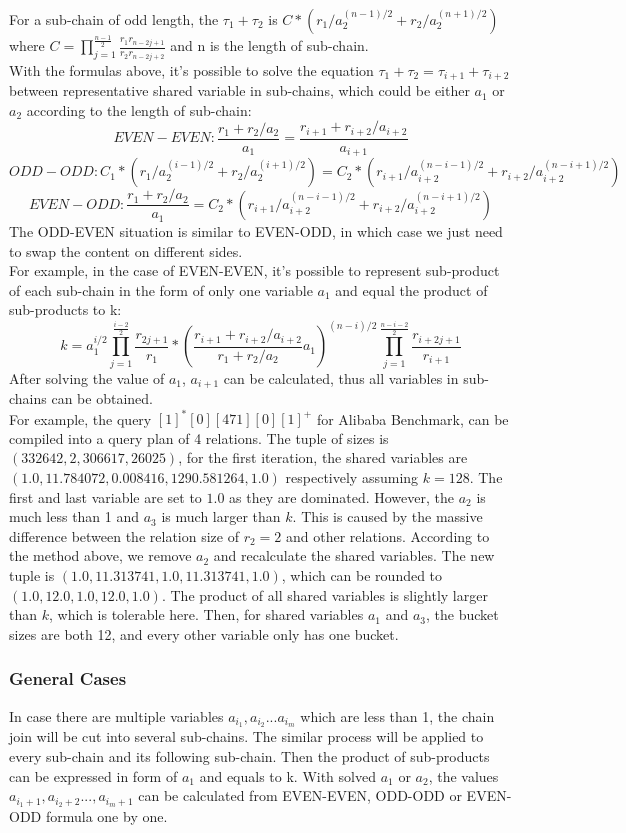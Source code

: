 For a sub-chain of odd length, the $\tau_{1} + \tau_{2}$ is $ C* ( r_1/a_2^{(n-1)/2}+r_2/a_2^{(n+1)/2} )$ where $C = \prod_{j=1}^{\frac{n-1}{2}}\frac{r_1r_{n-2j+1}}{r_2r_{n-2j+2}}$ and n is the length of sub-chain.\\
With the formulas above, it's possible to solve the equation $\tau_{1} + \tau_{2} = \tau_{i+1} + \tau_{i+2}$ between representative shared variable in sub-chains, which could be either $a_1$ or $a_2$ according to the length of sub-chain:
$$EVEN-EVEN : \frac{r_1+r_2/a_2}{a_1} = \frac{r_{i+1}+r_{i+2}/a_{i+2}}{a_{i+1}}$$
$$ODD-ODD :C_1* ( r_1/a_2^{(i-1)/2}+r_2/a_2^{(i+1)/2} ) = C_2* ( r_{i+1}/a_{i+2}^{(n-i-1)/2}+r_{i+2}/a_{i+2}^{(n-i+1)/2} ) $$
$$EVEN-ODD : \frac{r_1+r_2/a_2}{a_1} = C_2* ( r_{i+1}/a_{i+2}^{(n-i-1)/2}+r_{i+2}/a_{i+2}^{(n-i+1)/2} )$$
The ODD-EVEN situation is similar to EVEN-ODD, in which case we just need to swap the content on different sides.\\
For example, in the case of EVEN-EVEN, it's possible to represent sub-product of each sub-chain in the form of only one variable $a_1$ and equal the product of sub-products to k:
$$k = a_1^{i/2}\prod_{j=1}^{\frac{i-2}{2}}\frac{r_{2j+1}}{r_1}*(\frac{r_{i+1}+r_{i+2}/a_{i+2}}{r_1+r_2/a_2}a_1)^{(n-i)/2}\prod_{j=1}^{\frac{n-i-2}{2}}\frac{r_{i+2j+1}}{r_{i+1}}$$
After solving the value of $a_1$, $a_{i+1}$ can be calculated, thus all variables in sub-chains can be obtained.\\
For example, the query $ [1]^*[0][471][0][1]^+$ for Alibaba Benchmark, can be compiled into a query plan of 4 relations. The tuple of sizes is $(332642,2,306617,26025)$, for the first iteration, the shared variables are $(1.0,11.784072,0.008416,1290.581264,1.0)$ respectively assuming $k=128$. The first and last variable are set to $1.0$ as they are dominated. However, the $a_2$ is much less than 1 and $a_3$ is much larger than $k$. This is caused by the massive difference between the relation size of $r_2=2$ and other relations. According to the method above, we remove $a_2$ and recalculate the shared variables. The new tuple is $(1.0,11.313741,1.0,11.313741,1.0)$, which can be rounded to $(1.0,12.0,1.0,12.0,1.0)$. The product of all shared variables is slightly larger than $k$, which is tolerable here. Then, for shared variables $a_1$ and $a_3$, the bucket sizes are both 12, and every other variable only has one bucket.
\subsubsection{General Cases}
In case there are multiple variables $a_{i_1},a_{i_2}...a_{i_m}$ which are less than 1, the chain join will be cut into several sub-chains. The similar process will be applied to every sub-chain and its following sub-chain. Then the product of sub-products can be expressed in form of $a_1$ and equals to k. With solved $a_1$ or $a_2$, the values $a_{i_1+1},a_{i_2+2}...,a_{i_m+1}$ can be calculated from EVEN-EVEN, ODD-ODD or EVEN-ODD formula one by one.
